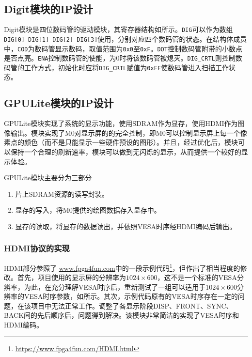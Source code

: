 \subsection{Digit模块的IP设计}
Digit模块是四位数码管的驱动模块，其寄存器结构如所示。\texttt{DIG}可以作为数组\texttt{DIG[0] DIG[1] DIG[2] DIG[3]}使用，分别对应四个数码管的状态。在结构体成员中，\texttt{COD}为数码管显示数码，取值范围为\texttt{0x0}至\texttt{0xF}。\texttt{DOT}控制数码管附带的小数点是否点亮。\texttt{ENA}控制数码管的使能，为$0$时将该数码管被熄灭。\texttt{DIG\_CRTL}则控制数码管的工作方式，初始化时应将\texttt{DIG\_CRTL}赋值为\texttt{0xFF}使数码管进入扫描工作状态。



\subsection{GPULite模块的IP设计}
GPULite模块实现了系统的显示功能，使用SDRAM作为显存，使用HDMI作为图像输出。模块实现了M0对显示屏的的完全控制，即M0可以控制显示屏上每一个像素点的颜色（而不是只能显示一些硬件预设的图形）。并且，经过优化后，模块可以保持一个合理的刷新速率，模块可以做到无闪烁的显示，从而提供一个较好的显示体验。

GPULite模块主要分为三部分
\begin{enumerate}
    \item 片上SDRAM资源的读写封装。
    \item 显存的写入，将M0提供的绘图数据存入显存中。
    \item 显存的读取，将显存的数据读出，并依照VESA时序经HDMI编码后输出。
\end{enumerate}

\subsubsection{HDMI协议的实现}
HDMI部分参照了 \url{www.fpga4fun.com}中的一段示例代码\footnote{\url{https://www.fpga4fun.com/HDMI.html}}，但作出了相当程度的修改。首先，项目使用的显示屏的分辨率为$1024\times 600$，这不是一个标准的VESA分辨率，为此，在充分理解VESA时序后，重新测试了一组可以适用于$1024\times 600$分辨率的VESA时序参数，如所示。其次，示例代码原有的VESA时序存在一定的问题，在该项目中无法正常工作。调整了各显示阶段DISP、FRONT、SYNC、BACK间的先后顺序后，问题得到解决。该模块非常简洁的实现了VESA时序和HDMI编码。


